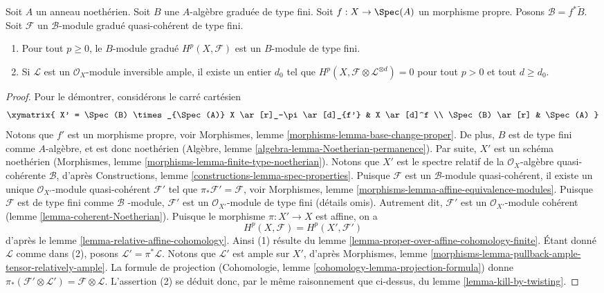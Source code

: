 \begin{lemma}
\label{lemma-graded-finiteness}
Soit $A$ un anneau noethérien.
Soit $B$ une $A$-algèbre graduée de
type fini. Soit $f : X \to \Spec(A)$ un morphisme propre.
Posons $\mathcal{B} = f^*\widetilde B$.
Soit $\mathcal{F}$
un $\mathcal{B}$-module gradué quasi-cohérent de type fini.
\begin{enumerate}
\item Pour tout $p \geq 0$, le $B$-module gradué $H^p(X, \mathcal{F})$
est un $B$-module de type fini.
\item Si $\mathcal{L}$ est un $\mathcal{O}_X$-module
inversible ample, il existe un entier $d_0$ tel que
$H^p(X, \mathcal{F} \otimes \mathcal{L}^{\otimes d}) = 0$
pour tout $p > 0$ et tout $d \geq d_0$.
\end{enumerate}
\end{lemma}

\begin{proof}
Pour le démontrer, considérons le carré cartésien
$$
\xymatrix{
X' = \Spec(B) \times_{\Spec(A)} X
\ar[r]_-\pi \ar[d]_{f'} &
X \ar[d]^f \\
\Spec(B) \ar[r] &
\Spec(A)
}
$$
Notons que $f'$ est un morphisme propre, voir
Morphismes, lemme \ref{morphisms-lemma-base-change-proper}. De
plus, $B$ est de type fini comme $A$-algèbre, et est donc
noethérien (Algèbre, lemme \ref{algebra-lemma-Noetherian-permanence}).
Par suite, $X'$ est un schéma noethérien
(Morphismes, lemme \ref{morphisms-lemma-finite-type-noetherian}).
Notons que $X'$ est le spectre relatif de la
$\mathcal{O}_X$-algèbre quasi-cohérente $\mathcal{B}$,
d'après Constructions, lemme \ref{constructions-lemma-spec-properties}.
Puisque $\mathcal{F}$ est un $\mathcal{B}$-module
quasi-cohérent, il existe un unique
$\mathcal{O}_{X'}$-module quasi-cohérent $\mathcal{F}'$ tel que
$\pi_*\mathcal{F}' = \mathcal{F}$, voir
Morphismes, lemme \ref{morphisms-lemma-affine-equivalence-modules}.
Puisque $\mathcal{F}$ est de type fini comme $\mathcal{B}$
-module, $\mathcal{F}'$ est un
$\mathcal{O}_{X'}$-module de type fini (détails omis). Autrement dit,
$\mathcal{F}'$ est un $\mathcal{O}_{X'}$-module cohérent
(lemme \ref{lemma-coherent-Noetherian}).
Puisque le morphisme $\pi : X' \to X$ est affine, on a
$$
H^p(X, \mathcal{F}) = H^p(X', \mathcal{F}')
$$
d'après le lemme \ref{lemma-relative-affine-cohomology}.
Ainsi (1) résulte du
lemme \ref{lemma-proper-over-affine-cohomology-finite}. Étant
donné $\mathcal{L}$ comme dans (2), posons
$\mathcal{L}' = \pi^*\mathcal{L}$. Notons que $\mathcal{L}'$ est
ample sur $X'$,
d'après Morphismes, lemme \ref{morphisms-lemma-pullback-ample-tensor-relatively-ample}.
La formule de projection
(Cohomologie, lemme \ref{cohomology-lemma-projection-formula}) donne
$\pi_*(\mathcal{F}' \otimes \mathcal{L}') = \mathcal{F} \otimes \mathcal{L}$.
L'assertion (2) se déduit donc, par le même raisonnement que ci-dessus, du
lemme \ref{lemma-kill-by-twisting}.
\end{proof}












